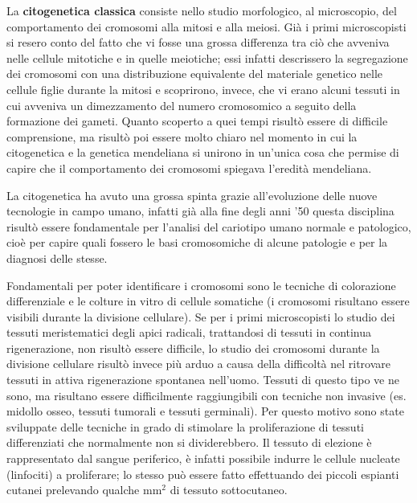 \documentclass[11pt]{book}
\begin{document}
La \textbf{citogenetica classica} consiste nello studio morfologico, al microscopio, del comportamento dei cromosomi alla mitosi e alla meiosi. 
Già i primi microscopisti si resero conto del fatto che vi fosse una grossa differenza tra ciò che avveniva nelle cellule mitotiche e in quelle meiotiche; essi infatti descrissero la segregazione dei cromosomi con una distribuzione equivalente del materiale genetico nelle cellule figlie durante la mitosi e scoprirono, invece, che vi erano alcuni tessuti in cui avveniva un dimezzamento del numero cromosomico a seguito della formazione dei gameti. Quanto scoperto a quei tempi risultò essere di difficile comprensione, ma risultò poi essere molto chiaro nel momento in cui la citogenetica e la genetica mendeliana si unirono in un’unica cosa che permise di capire che il comportamento dei cromosomi spiegava l’eredità mendeliana.

La citogenetica ha avuto una grossa spinta grazie all’evoluzione delle nuove tecnologie in campo umano, infatti già alla fine degli anni '50 questa disciplina risultò essere fondamentale per l’analisi del cariotipo umano normale e patologico, cioè per capire quali fossero le basi cromosomiche di alcune patologie e per la diagnosi delle stesse.

Fondamentali per poter identificare i cromosomi sono le tecniche di colorazione differenziale e le colture in vitro di cellule somatiche (i cromosomi risultano essere visibili durante la divisione cellulare). Se per i primi microscopisti lo studio dei tessuti meristematici degli apici radicali, trattandosi di tessuti in continua rigenerazione, non risultò essere difficile, lo studio dei cromosomi durante la divisione cellulare risultò invece più arduo a causa della difficoltà nel ritrovare tessuti in attiva rigenerazione spontanea nell’uomo. Tessuti di questo tipo ve ne sono, ma risultano essere difficilmente raggiungibili con tecniche non invasive (es. midollo osseo, tessuti tumorali e tessuti germinali).
Per questo motivo sono state sviluppate delle tecniche in grado di stimolare la proliferazione di tessuti differenziati che normalmente non si dividerebbero. Il tessuto di elezione è rappresentato dal sangue periferico, è infatti possibile indurre le cellule nucleate (linfociti) a proliferare; lo stesso può essere fatto effettuando dei piccoli espianti cutanei prelevando qualche mm\(^2\) di tessuto sottocutaneo.
\end{document}
